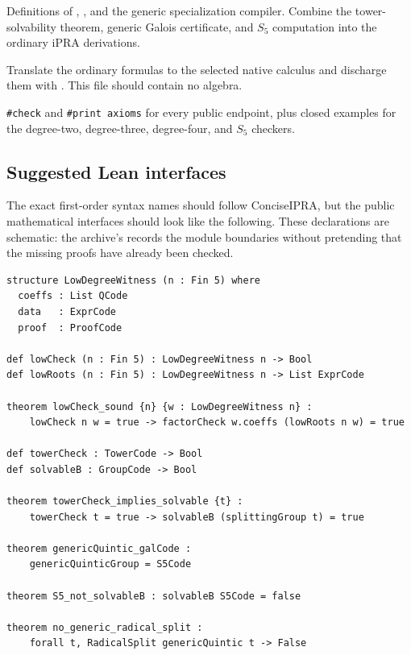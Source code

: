 \begin{description}[style=nextline]
\item[\code{AbelRuffiniPRA.lean}]
Definitions of , , and the
generic specialization compiler.  Combine the tower-solvability theorem,
generic Galois certificate, and $S_5$ computation into the ordinary iPRA
derivations.

\item[\code{AbelRuffiniNative.lean}]
Translate the ordinary formulas to the selected native calculus and discharge
them with .  This file should contain no algebra.

\item[\code{Audit.lean}]
\texttt{\#check} and \texttt{\#print axioms} for every public endpoint, plus closed
examples for the degree-two, degree-three, degree-four, and $S_5$ checkers.
\end{description}

\subsection{Suggested Lean interfaces}

The exact first-order syntax names should follow ConciseIPRA, but the public
mathematical interfaces should look like the following.  These declarations
are schematic: the archive's  records
the module boundaries without pretending that the missing proofs have already
been checked.

\begin{lstlisting}[style=lean,language={},caption={Certificate-level endpoints}]
structure LowDegreeWitness (n : Fin 5) where
  coeffs : List QCode
  data   : ExprCode
  proof  : ProofCode

def lowCheck (n : Fin 5) : LowDegreeWitness n -> Bool
def lowRoots (n : Fin 5) : LowDegreeWitness n -> List ExprCode

theorem lowCheck_sound {n} {w : LowDegreeWitness n} :
    lowCheck n w = true -> factorCheck w.coeffs (lowRoots n w) = true

def towerCheck : TowerCode -> Bool
def solvableB : GroupCode -> Bool

theorem towerCheck_implies_solvable {t} :
    towerCheck t = true -> solvableB (splittingGroup t) = true

theorem genericQuintic_galCode :
    genericQuinticGroup = S5Code

theorem S5_not_solvableB : solvableB S5Code = false

theorem no_generic_radical_split :
    forall t, RadicalSplit genericQuintic t -> False
\end{lstlisting}

